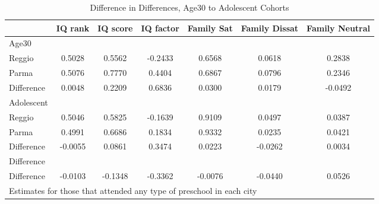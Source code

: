 \begin{table}[htbp]\centering
\caption{Difference in Differences, Age30 to Adolescent Cohorts}
\begin{tabular}{l*{6}{c}}
\hline\hline
            &     IQ rank&    IQ score&   IQ factor&  Family Sat&Family Dissat&Family Neutral\\
\hline
Age30       &            &            &            &            &            &            \\
Reggio      &      0.5028&      0.5562&     -0.2433&      0.6568&      0.0618&      0.2838\\
Parma       &      0.5076&      0.7770&      0.4404&      0.6867&      0.0796&      0.2346\\
Difference  &      0.0048&      0.2209&      0.6836&      0.0300&      0.0179&     -0.0492\\
\hline
Adolescent  &            &            &            &            &            &            \\
Reggio      &      0.5046&      0.5825&     -0.1639&      0.9109&      0.0497&      0.0387\\
Parma       &      0.4991&      0.6686&      0.1834&      0.9332&      0.0235&      0.0421\\
Difference  &     -0.0055&      0.0861&      0.3474&      0.0223&     -0.0262&      0.0034\\
\hline
Difference  &            &            &            &            &            &            \\
Difference  &     -0.0103&     -0.1348&     -0.3362&     -0.0076&     -0.0440&      0.0526\\
\hline\hline
\multicolumn{7}{l}{\footnotesize Estimates for those that attended any type of preschool in each city}\\
\end{tabular}
\end{table}
